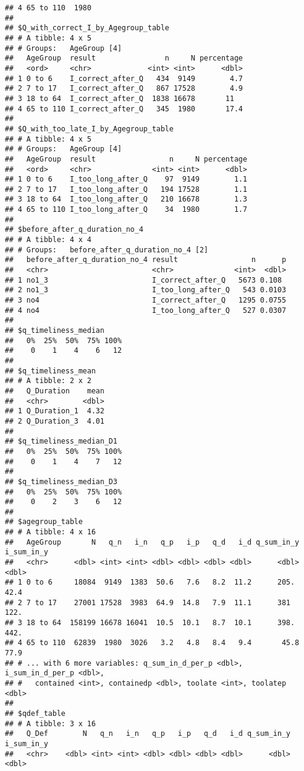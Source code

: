 \documentclass[
]{article}
\begin{document}
\begin{verbatim}
## 4 65 to 110  1980
## 
## $Q_with_correct_I_by_Agegroup_table
## # A tibble: 4 x 5
## # Groups:   AgeGroup [4]
##   AgeGroup  result                n     N percentage
##   <ord>     <chr>             <int> <int>      <dbl>
## 1 0 to 6    I_correct_after_Q   434  9149        4.7
## 2 7 to 17   I_correct_after_Q   867 17528        4.9
## 3 18 to 64  I_correct_after_Q  1838 16678       11  
## 4 65 to 110 I_correct_after_Q   345  1980       17.4
## 
## $Q_with_too_late_I_by_Agegroup_table
## # A tibble: 4 x 5
## # Groups:   AgeGroup [4]
##   AgeGroup  result                 n     N percentage
##   <ord>     <chr>              <int> <int>      <dbl>
## 1 0 to 6    I_too_long_after_Q    97  9149        1.1
## 2 7 to 17   I_too_long_after_Q   194 17528        1.1
## 3 18 to 64  I_too_long_after_Q   210 16678        1.3
## 4 65 to 110 I_too_long_after_Q    34  1980        1.7
## 
## $before_after_q_duration_no_4
## # A tibble: 4 x 4
## # Groups:   before_after_q_duration_no_4 [2]
##   before_after_q_duration_no_4 result                 n      p
##   <chr>                        <chr>              <int>  <dbl>
## 1 no1_3                        I_correct_after_Q   5673 0.108 
## 2 no1_3                        I_too_long_after_Q   543 0.0103
## 3 no4                          I_correct_after_Q   1295 0.0755
## 4 no4                          I_too_long_after_Q   527 0.0307
## 
## $q_timeliness_median
##   0%  25%  50%  75% 100% 
##    0    1    4    6   12 
## 
## $q_timeliness_mean
## # A tibble: 2 x 2
##   Q_Duration    mean
##   <chr>        <dbl>
## 1 Q_Duration_1  4.32
## 2 Q_Duration_3  4.01
## 
## $q_timeliness_median_D1
##   0%  25%  50%  75% 100% 
##    0    1    4    7   12 
## 
## $q_timeliness_median_D3
##   0%  25%  50%  75% 100% 
##    0    2    3    6   12 
## 
## $agegroup_table
## # A tibble: 4 x 16
##   AgeGroup       N   q_n   i_n   q_p   i_p   q_d   i_d q_sum_in_y i_sum_in_y
##   <chr>      <dbl> <int> <int> <dbl> <dbl> <dbl> <dbl>      <dbl>      <dbl>
## 1 0 to 6     18084  9149  1383  50.6   7.6   8.2  11.2      205.        42.4
## 2 7 to 17    27001 17528  3983  64.9  14.8   7.9  11.1      381        122. 
## 3 18 to 64  158199 16678 16041  10.5  10.1   8.7  10.1      398.       442. 
## 4 65 to 110  62839  1980  3026   3.2   4.8   8.4   9.4       45.8       77.9
## # ... with 6 more variables: q_sum_in_d_per_p <dbl>, i_sum_in_d_per_p <dbl>,
## #   contained <int>, containedp <dbl>, toolate <int>, toolatep <dbl>
## 
## $qdef_table
## # A tibble: 3 x 16
##   Q_Def        N   q_n   i_n   q_p   i_p   q_d   i_d q_sum_in_y i_sum_in_y
##   <chr>    <dbl> <int> <int> <dbl> <dbl> <dbl> <dbl>      <dbl>      <dbl>

\end{verbatim}
\end{document}
